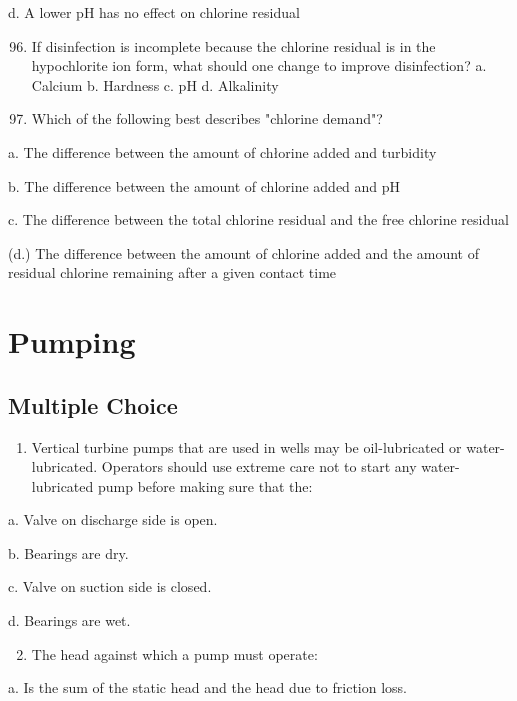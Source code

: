 \documentclass[10pt]{article}
\begin{document}
\begin{enumerate}
\begin{enumerate}
d. A lower $\mathrm{pH}$ has no effect on chlorine residual

\begin{enumerate}
  \setcounter{enumi}{95}
  \item If disinfection is incomplete because the chlorine residual is in the hypochlorite ion form, what should one change to improve disinfection?
a. Calcium
b. Hardness
c. $\mathrm{pH}$
d. Alkalinity

  \item Which of the following best describes "chlorine demand"?

\end{enumerate}

a. The difference between the amount of chłorine added and turbidity

b. The difference between the amount of chlorine added and $\mathrm{pH}$

c. The difference between the total chlorine residual and the free chlorine residual

(d.) The difference between the amount of chlorine added and the amount of residual chlorine remaining after a given contact time

\newpage
\section{Pumping}
\subsection{Multiple Choice}
\begin{enumerate}
  \item Vertical turbine pumps that are used in wells may be oil-lubricated or water-lubricated. Operators should use extreme care not to start any water-lubricated pump before making sure that the:
\end{enumerate}

a. Valve on discharge side is open.

b. Bearings are dry.

c. Valve on suction side is closed.

d. Bearings are wet.

\begin{enumerate}
  \setcounter{enumi}{1}
  \item The head against which a pump must operate:
\end{enumerate}

a. Is the sum of the static head and the head due to friction loss.


\end{enumerate}
\end{enumerate}
\end{document}

